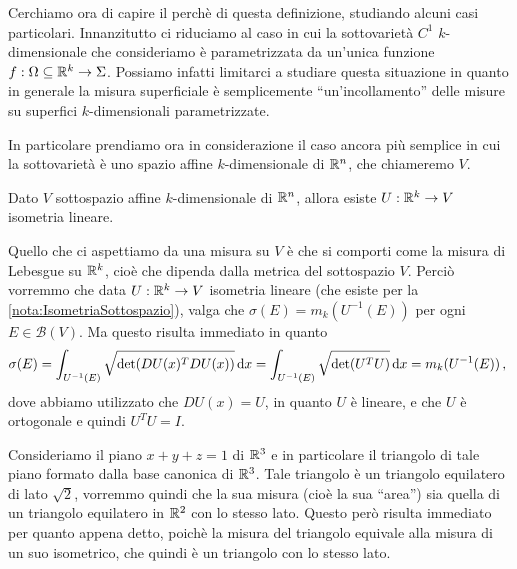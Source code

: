 Cerchiamo ora di capire il perchè di questa definizione, studiando alcuni casi particolari. Innanzitutto ci riduciamo al caso in cui la sottovarietà $C^1$ $k$-dimensionale che consideriamo è parametrizzata da un'unica funzione $f:\Omega\subseteq \mathbb R^k\to\Sigma$. Possiamo infatti limitarci a studiare questa situazione in quanto in generale la misura superficiale è semplicemente ``un'incollamento'' delle misure su superfici $k$-dimensionali parametrizzate. 

In particolare prendiamo ora in considerazione il caso ancora più semplice in cui la sottovarietà è uno spazio affine $k$-dimensionale di $\mathbb R^n$, che chiameremo $V$.

\begin{remark}\label{nota:IsometriaSottospazio}
	Dato $V$ sottospazio affine $k$-dimensionale di $\mathbb R^n$, allora esiste $U:\mathbb R^k\to V$ isometria lineare.
\end{remark}

Quello che ci aspettiamo da una misura su $V$ è che si comporti come la misura di Lebesgue su $\mathbb R^k$, cioè che dipenda dalla metrica del sottospazio $V$. Perciò vorremmo che data $U:\mathbb R^k\to V$ isometria lineare (che esiste per la \cref{nota:IsometriaSottospazio}), valga che $\sigma(E)=m_k(U^{-1}(E))$ per ogni $E\in\mathcal{B}(V)$. Ma questo risulta immediato in quanto
\begin{equation*}
	\sigma(E)=\int_{U^{-1}(E)}\sqrt{\det(DU(x)^TDU(x))}\,\mathrm d x=\int_{U^{-1}(E)}\sqrt{\det(U^TU)}\,\mathrm d x=m_k(U^{-1}(E))\, \text{, }
\end{equation*}
dove abbiamo utilizzato che $DU(x)=U$, in quanto $U$ è lineare, e che $U$ è ortogonale e quindi $U^TU=I$.

\begin{example}
	Consideriamo il piano $x+y+z=1$ di $\mathbb R^3$ e in particolare il triangolo di tale piano formato dalla base canonica di $\mathbb R^3$. Tale triangolo è un triangolo equilatero di lato $\sqrt{2}$, vorremmo quindi che la sua misura (cioè la sua ``area'') sia quella di un triangolo equilatero in $\mathbb R^2$ con lo stesso lato. Questo però risulta immediato per quanto appena detto, poichè la misura del triangolo equivale alla misura di un suo isometrico, che quindi è un triangolo con lo stesso lato.
\end{example}